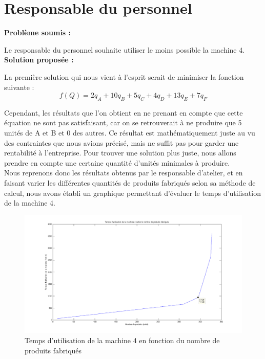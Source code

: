 \documentclass[paper=a4, fontsize=11pt]{report}
\numberwithin{equation}{section}		%
\numberwithin{figure}{section}			%
\numberwithin{table}{section}				%
\renewcommand{\bf}[1]{\textbf{#1}}
\begin{document}
\section{Responsable du personnel}
\bf{Problème soumis :}

Le responsable du personnel souhaite utiliser le moins possible la machine 4.\\

\bf{Solution proposée :}

La première solution qui nous vient à l’esprit serait de minimiser la fonction suivante :\[f(Q) = 2q_A + 10q_B + 5q_C + 4q_D + 13q_E + 7q_F\]

Cependant, les résultats que l’on obtient en ne prenant en compte que cette équation ne sont pas satisfaisant, car on se retrouverait à ne produire que 5 unités de A et B et 0 des autres. Ce résultat est mathématiquement juste au vu des contraintes que nous avions précisé, mais ne suffit pas pour garder une rentabilité à l’entreprise. Pour trouver une solution plus juste, nous allons prendre en compte une certaine quantité d’unités minimales à produire. \\

Nous reprenons donc les résultats obtenus par le responsable d’atelier, et en faisant varier les différentes quantités de produits fabriqués selon sa méthode de calcul, nous avons établi un graphique permettant d’évaluer le temps d’utilisation de la machine 4.\\

\begin{figure}[H]
\caption{Temps d'utilisation de la machine 4 en fonction du nombre de produits fabriqués}
\centering
\includegraphics[width=16cm]{figures/graphe-personnel.png}
\end{figure}
\end{document}
